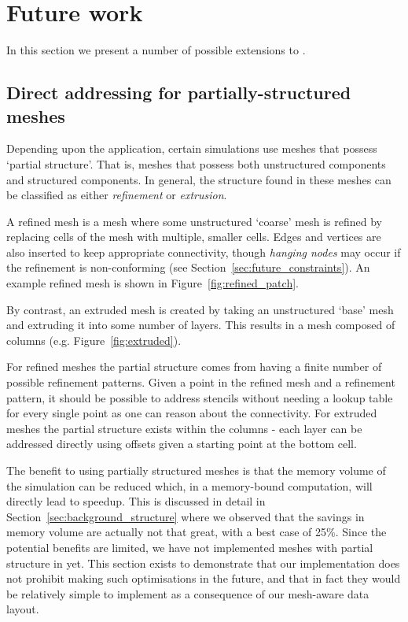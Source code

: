 \section{Future work}
\label{sec:future}

In this section we present a number of possible extensions to .

\subsection{Direct addressing for partially-structured meshes}
\label{sec:future_partialstructure}

Depending upon the application, certain simulations use meshes that possess `partial structure'.
That is, meshes that possess both unstructured components and structured components.
In general, the structure found in these meshes can be classified as either \textit{refinement} or \textit{extrusion}.

A refined mesh is a mesh where some unstructured `coarse' mesh is refined by replacing cells of the mesh with multiple, smaller cells.
Edges and vertices are also inserted to keep appropriate connectivity, though \textit{hanging nodes} may occur if the refinement is non-conforming (see Section~\ref{sec:future_constraints}).
An example refined mesh is shown in Figure~\ref{fig:refined_patch}.

By contrast, an extruded mesh is created by taking an unstructured `base' mesh and extruding it into some number of layers.
This results in a mesh composed of columns (e.g. Figure~\ref{fig:extruded}).

For refined meshes the partial structure comes from having a finite number of possible refinement patterns.
Given a point in the refined mesh and a refinement pattern, it should be possible to address stencils without needing a lookup table for every single point as one can reason about the connectivity.
For extruded meshes the partial structure exists within the columns - each layer can be addressed directly using offsets given a starting point at the bottom cell.

The benefit to using partially structured meshes is that the memory volume of the simulation can be reduced which, in a memory-bound computation, will directly lead to speedup.
This is discussed in detail in Section~\ref{sec:background_structure} where we observed that the savings in memory volume are actually not that great, with a best case of 25\%.
Since the potential benefits are limited, we have not implemented meshes with partial structure in  yet.
This section exists to demonstrate that our implementation does not prohibit making such optimisations in the future, and that in fact they would be relatively simple to implement as a consequence of our mesh-aware data layout.

